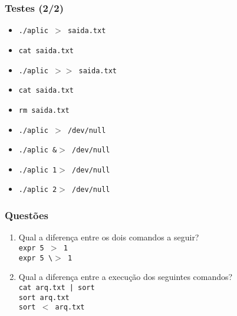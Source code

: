 \documentclass[aspectratio=169]{beamer}
\begin{document}
\begin{frame}\frametitle{Testes (2/2)}
\begin{itemize}
	\item \texttt{./aplic $>$ saida.txt}
	\item \texttt{cat saida.txt}
	\item \texttt{./aplic $>>$ saida.txt}
	\item \texttt{cat saida.txt}
	\item \texttt{rm saida.txt}
	\item \texttt{./aplic $>$ /dev/null}
	\item \texttt{./aplic \&$>$ /dev/null}
	\item \texttt{./aplic 1$>$ /dev/null}
	\item \texttt{./aplic 2$>$ /dev/null}
\end{itemize}
\end{frame}

\begin{frame}\frametitle{Questões}
\begin{enumerate}
	\item Qual a diferença entre os dois comandos a seguir?\\
\texttt{expr 5 $>$ 1\\
expr 5 \textbackslash$>$ 1}
	\item Qual a diferença entre a execução dos seguintes comandos?\\
\texttt{cat arq.txt | sort\\
sort arq.txt\\
sort $<$ arq.txt}
\end{enumerate}
\end{frame}
\end{document}
